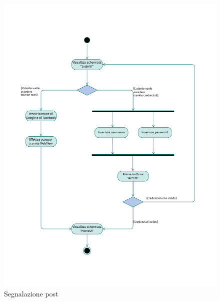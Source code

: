 \documentclass{natourDoc}
\begin{document}
\newpage
\begin{figure}[!htbp]
	\centering
	\includegraphics[width=\textwidth, page=14]{./diagrams/activity.pdf}
	\caption{Segnalazione post}
\end{figure}
\FloatBarrier

\newpage
\end{document}
